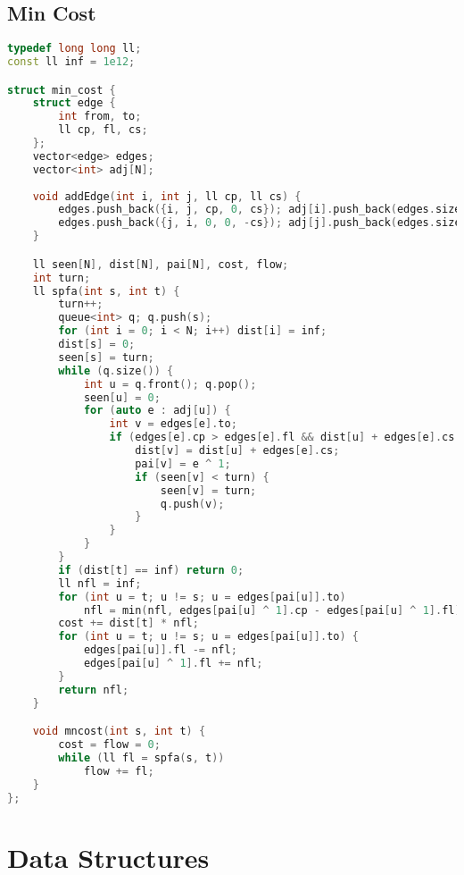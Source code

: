 \documentclass{article}
\begin{document}
\subsection{Min Cost}
\begin{lstlisting}[language=C++]
typedef long long ll;
const ll inf = 1e12;

struct min_cost {
	struct edge {
		int from, to;
		ll cp, fl, cs;
	};
	vector<edge> edges;
	vector<int> adj[N];
	
	void addEdge(int i, int j, ll cp, ll cs) {
		edges.push_back({i, j, cp, 0, cs}); adj[i].push_back(edges.size() - 1);
		edges.push_back({j, i, 0, 0, -cs}); adj[j].push_back(edges.size() - 1);
	}

	ll seen[N], dist[N], pai[N], cost, flow;
	int turn;
	ll spfa(int s, int t) {
		turn++;
		queue<int> q; q.push(s);
		for (int i = 0; i < N; i++) dist[i] = inf;
		dist[s] = 0;
		seen[s] = turn;
		while (q.size()) {
			int u = q.front(); q.pop();
			seen[u] = 0;
			for (auto e : adj[u]) {
				int v = edges[e].to;
				if (edges[e].cp > edges[e].fl && dist[u] + edges[e].cs < dist[v]) {
					dist[v] = dist[u] + edges[e].cs;
					pai[v] = e ^ 1;
					if (seen[v] < turn) {
						seen[v] = turn;
						q.push(v);
					}
				}
			}
		}
		if (dist[t] == inf) return 0;
		ll nfl = inf;
		for (int u = t; u != s; u = edges[pai[u]].to)
			nfl = min(nfl, edges[pai[u] ^ 1].cp - edges[pai[u] ^ 1].fl);
		cost += dist[t] * nfl;
		for (int u = t; u != s; u = edges[pai[u]].to) {
			edges[pai[u]].fl -= nfl;
			edges[pai[u] ^ 1].fl += nfl;
		}
		return nfl;
	}

	void mncost(int s, int t) {
		cost = flow = 0;
		while (ll fl = spfa(s, t))
			flow += fl;
	}
};
\end{lstlisting}
\section{Data Structures}
\end{document}
